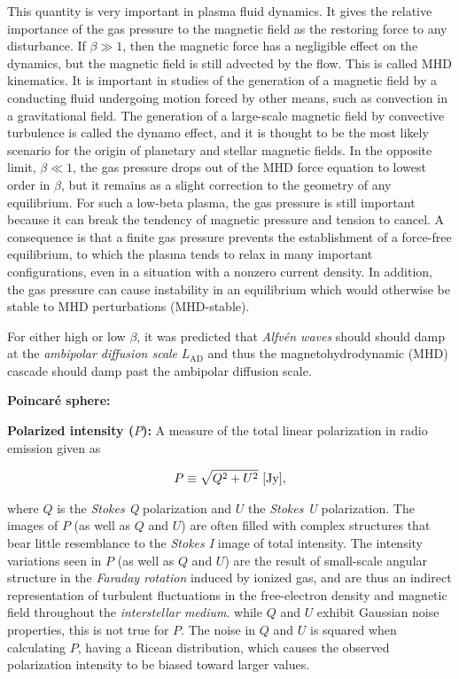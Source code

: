 \documentclass[a4paper,10pt]{article}
\begin{document}
{\noindent}This quantity is very important in plasma fluid dynamics. It gives the relative importance of the gas pressure to the magnetic field as the restoring force to any disturbance. If $\beta\gg1$, then the magnetic force has a negligible effect on the dynamics, but the magnetic field is still advected by the flow. This is called MHD kinematics. It is important in studies of the generation of a magnetic field by a conducting fluid undergoing motion forced by other means, such as convection in a gravitational field. The generation of a large-scale magnetic field by convective turbulence is called the dynamo effect, and it is thought to be the most likely scenario for the origin of planetary and stellar magnetic fields. In the opposite limit, $\beta\ll1$, the gas pressure drops out of the MHD force equation to lowest order in $\beta$, but it remains as a slight correction to the geometry of any equilibrium. For such a low-beta plasma, the gas pressure is still important because it can break the tendency of magnetic pressure and tension to cancel. A consequence is that a finite gas pressure prevents the establishment of a force-free equilibrium, to which the plasma tends to relax in many important configurations, even in a situation with a nonzero current density. In addition, the gas pressure can cause instability in an equilibrium which would otherwise be stable to MHD perturbations (MHD-stable).

{\noindent}For either high or low $\beta$, it was predicted that \textit{Alfv\'en waves} should should damp at the \textit{ambipolar diffusion scale} $L_\mathrm{AD}$ and thus the magnetohydrodynamic (MHD) cascade should damp past the ambipolar diffusion scale.

{\noindent}\textbf{Poincar\'e sphere:}

{\noindent}\textbf{Polarized intensity ($P$):} A measure of the total linear polarization in radio emission given as

\begin{align*}
    P\equiv\sqrt{Q^2+U^2} ~ [{\rm Jy}],
\end{align*}

{\noindent}where $Q$ is the \textit{Stokes Q} polarization and $U$ the \textit{Stokes U} polarization. The images of $P$ (as well as $Q$ and $U$) are often filled with complex structures that bear little resemblance to the \textit{Stokes I} image of total intensity. The intensity variations seen in $P$ (as well as $Q$ and $U$) are the result of small-scale angular structure in the \textit{Faraday rotation} induced by ionized gas, and are thus an indirect representation of turbulent fluctuations in the free-electron density and magnetic field throughout the \textit{interstellar medium}. while $Q$ and $U$ exhibit Gaussian noise properties, this is not true for $P$. The noise in $Q$ and $U$ is squared when calculating $P$, having a Ricean distribution, which causes the observed polarization intensity to be biased toward larger values.
\end{document}
